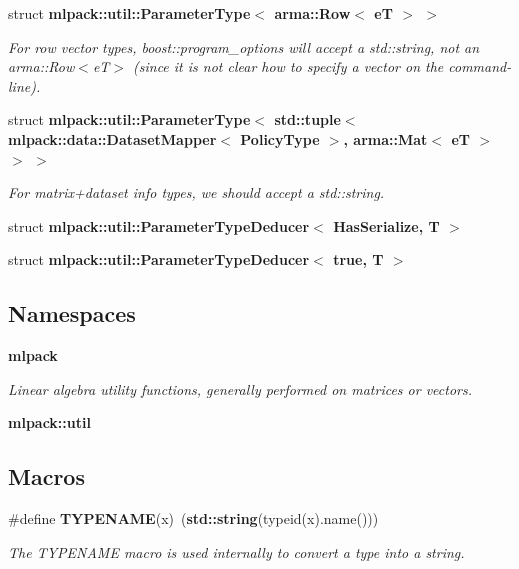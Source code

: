 \begin{DoxyCompactItemize}
struct {\bf mlpack\+::util\+::\+Parameter\+Type$<$ arma\+::\+Row$<$ e\+T $>$ $>$}
\begin{DoxyCompactList}\small\item\em For row vector types, boost\+::program\+\_\+options will accept a std\+::string, not an arma\+::\+Row$<$e\+T$>$ (since it is not clear how to specify a vector on the command-\/line). \end{DoxyCompactList}\item 
struct {\bf mlpack\+::util\+::\+Parameter\+Type$<$ std\+::tuple$<$ mlpack\+::data\+::\+Dataset\+Mapper$<$ Policy\+Type $>$, arma\+::\+Mat$<$ e\+T $>$ $>$ $>$}
\begin{DoxyCompactList}\small\item\em For matrix+dataset info types, we should accept a std\+::string. \end{DoxyCompactList}\item 
struct {\bf mlpack\+::util\+::\+Parameter\+Type\+Deducer$<$ Has\+Serialize, T $>$}
\item 
struct {\bf mlpack\+::util\+::\+Parameter\+Type\+Deducer$<$ true, T $>$}
\end{DoxyCompactItemize}
\subsection*{Namespaces}
\begin{DoxyCompactItemize}
\item 
 {\bf mlpack}
\begin{DoxyCompactList}\small\item\em Linear algebra utility functions, generally performed on matrices or vectors. \end{DoxyCompactList}\item 
 {\bf mlpack\+::util}
\end{DoxyCompactItemize}
\subsection*{Macros}
\begin{DoxyCompactItemize}
\item 
\#define {\bf T\+Y\+P\+E\+N\+A\+ME}(x)~({\bf std\+::string}(typeid(x).name()))
\begin{DoxyCompactList}\small\item\em The T\+Y\+P\+E\+N\+A\+ME macro is used internally to convert a type into a string. \end{DoxyCompactList}\end{DoxyCompactItemize}
